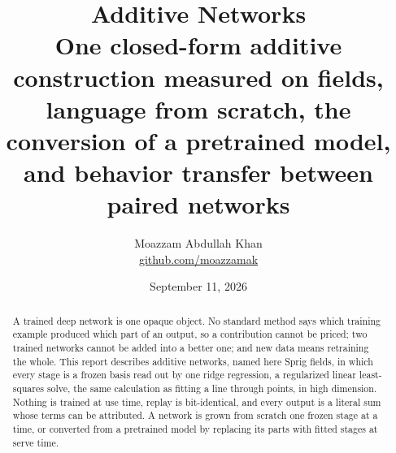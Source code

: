 \documentclass[11pt]{article}
\title{\bfseries Additive Networks\\[0.4em]
\large One closed-form additive construction measured on fields,
language from scratch, the conversion of a pretrained model, and
behavior transfer between paired networks}
\author{Moazzam Abdullah Khan\\[0.4em]
\large \href{https://github.com/moazzamak}{github.com/moazzamak}}
\date{September 11, 2026}
\begin{document}
\maketitle

\begin{abstract}
A trained deep network is one opaque object. No standard method
says which training example produced which part of an output, so a
contribution cannot be priced; two trained networks cannot be added
into a better one; and new data means retraining the whole. This
report describes additive networks, named here Sprig fields, in
which every stage is a frozen
basis read out by one ridge regression, a regularized linear
least-squares solve, the same calculation as fitting a line through
points, in high dimension. Nothing is trained at use time, replay
is bit-identical, and every output is a literal sum whose terms can
be attributed. A network is grown from scratch one frozen stage at
a time, or converted from a pretrained model by replacing its parts
with fitted stages at serve time.


\end{abstract}
\end{document}
